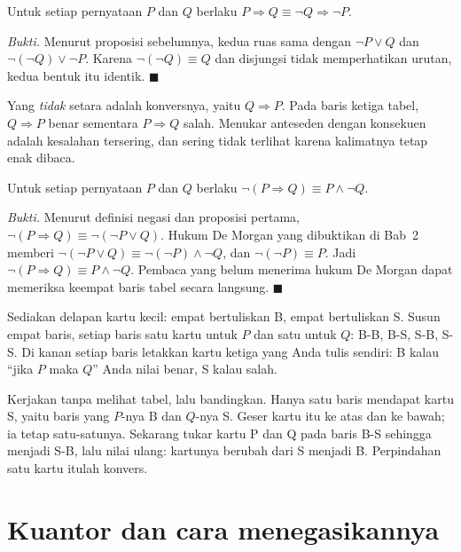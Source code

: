 \begin{akibat}[Kontraposisi]
Untuk setiap pernyataan $P$ dan $Q$ berlaku
$P \Rightarrow Q \equiv \neg Q \Rightarrow \neg P$.
\end{akibat}
\par\smallskip\noindent\textit{Bukti.} Menurut proposisi sebelumnya, kedua ruas sama dengan $\neg P \vee Q$ dan
$\neg(\neg Q) \vee \neg P$. Karena $\neg(\neg Q) \equiv Q$ dan disjungsi tidak
memperhatikan urutan, kedua bentuk itu identik.
\hfill$\blacksquare${\parfillskip=0pt\par}

Yang \emph{tidak} setara adalah konversnya, yaitu $Q \Rightarrow P$. Pada baris ketiga
tabel, $Q \Rightarrow P$ benar sementara $P \Rightarrow Q$ salah. Menukar anteseden
dengan konsekuen adalah kesalahan tersering, dan sering tidak terlihat karena kalimatnya
tetap enak dibaca.

\begin{proposisi}
Untuk setiap pernyataan $P$ dan $Q$ berlaku
$\neg(P \Rightarrow Q) \equiv P \wedge \neg Q$.
\end{proposisi}
\par\smallskip\noindent\textit{Bukti.} Menurut definisi negasi dan proposisi pertama,
$\neg(P \Rightarrow Q) \equiv \neg(\neg P \vee Q)$. Hukum De Morgan yang dibuktikan di
Bab~2 memberi $\neg(\neg P \vee Q) \equiv \neg(\neg P) \wedge \neg Q$, dan
$\neg(\neg P) \equiv P$. Jadi $\neg(P \Rightarrow Q) \equiv P \wedge \neg Q$.
Pembaca yang belum menerima hukum De Morgan dapat memeriksa keempat baris tabel secara
langsung.
\hfill$\blacksquare${\parfillskip=0pt\par}

\begin{tangan}
Sediakan delapan kartu kecil: empat bertuliskan B, empat bertuliskan S. Susun empat baris,
setiap baris satu kartu untuk $P$ dan satu untuk $Q$: B-B, B-S, S-B, S-S. Di kanan setiap
baris letakkan kartu ketiga yang Anda tulis sendiri: B kalau ``jika $P$ maka $Q$'' Anda
nilai benar, S kalau salah.

Kerjakan tanpa melihat tabel, lalu bandingkan. Hanya satu baris mendapat kartu S, yaitu
baris yang $P$-nya B dan $Q$-nya S. Geser kartu itu ke atas dan ke bawah; ia tetap
satu-satunya. Sekarang tukar kartu P dan Q pada baris B-S sehingga menjadi S-B, lalu nilai
ulang: kartunya berubah dari S menjadi B. Perpindahan satu kartu itulah konvers.
\end{tangan}

\section{Kuantor dan cara menegasikannya}

